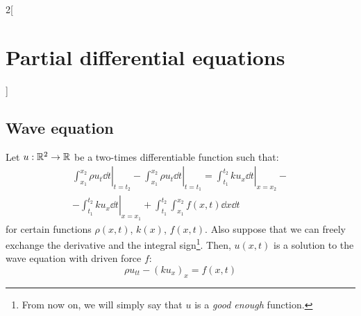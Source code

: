 \documentclass[../../../main_math.tex]{subfiles}
\begin{document}
\begin{multicols}{2}[\section{Partial differential equations}]
  \subsection{Wave equation}
  \begin{proposition}
    Let $u:\mathbb{R}^2\rightarrow\mathbb{R}$ be a two-times differentiable function such that:
    \begin{multline*}
      \left.\int_{x_1}^{x_2}\rho u_t\dd{t}\right|_{t=t_2}-\left.\int_{x_1}^{x_2}\rho u_t\dd{t}\right|_{t=t_1}=\left.\int_{t_1}^{t_2}ku_x\dd{t}\right|_{x=x_2}-\\-\left.\int_{t_1}^{t_2}ku_x\dd{t}\right|_{x=x_1}+\int_{t_1}^{t_2}\int_{x_1}^{x_2}f(x,t)\dd{x}\dd{t}
    \end{multline*}
    for certain functions $\rho(x,t)$, $k(x)$, $f(x,t)$. Also suppose that we can freely exchange the derivative and the integral sign\footnote{From now on, we will simply say that $u$ is a \emph{good enough} function.}. Then, $u(x,t)$ is a solution to the wave equation with driven force $f$:
    $$\rho u_{tt}-{(ku_x)}_x=f(x,t)$$
  \end{proposition}

\end{multicols}
\end{document}
